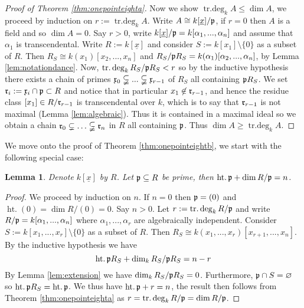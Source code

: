 \documentclass[12pt]{article}
\theoremstyle{plain}
\newtheorem{lemma}[thm]{Lemma}
\theoremstyle{definition}
\begin{document}
\begin{proof}[Proof of Theorem \ref{thm:onepointeighta}]
		Now we show $\operatorname{tr.deg}_kA \leq \operatorname{dim}A$, we proceed by induction on $r:= \operatorname{tr.deg}_kA$. Write $A \cong k[\underline{x}]/\frak{p}$, if $r = 0$ then $A$ is a field and so $\operatorname{dim}A = 0$. Say $r > 0$, write $k[\underline{x}]/\frak{p} = k[\alpha_1,...,\alpha_n]$ and assume that $\alpha_1$ is transcendental. Write $R := k[\underline{x}]$ and consider $S := k[x_1]\setminus\lbrace 0 \rbrace$ as a subset of $R$. Then $R_S \cong k(x_1)[x_2,...,x_n]$ and $R_S/\frak{p}R_S = k(\alpha_1)[\alpha_2,...,\alpha_n]$, by Lemma \ref{lem:notationdance}. Now, $\operatorname{tr.deg}_kR_S/\frak{p}R_S < r$ so by the inductive hypothesis there exists a chain of primes $\frak{x}_0 \subsetneqq ... \subsetneqq \frak{x}_{r-1}$ of $R_S$ all containing $\frak{p}R_S$. We set $\frak{r}_i := \frak{x}_i \cap \frak{p} \subset R$ and notice that in particular $x_1 \not\in \frak{r}_{r-1}$, and hence the residue class $[x_1] \in R/\frak{r}_{r-1}$ is transcendental over $k$, which is to say that $\frak{r}_{r-1}$ is not maximal (Lemma \ref{lem:algebraic}). Thus it is contained in a maximal ideal so we obtain a chain $\frak{r}_0 \subsetneq \hdots \subsetneqq \frak{r}_n$ in $R$ all containing $\frak{p}$. Thus $\operatorname{dim}A\geq \operatorname{tr.deg}_kA$.
	\end{proof}
	We move onto the proof of Theorem \ref{thm:onepointeightb}, we start with the following special case:
	\begin{lemma}
		\label{lemma:onepointeightb}
		Denote $k[\underline{x}]$ by $R$. Let $\frak{p} \subseteq R$ be prime, then $\operatorname{ht.}\frak{p} + \operatorname{dim}R/\frak{p} = n$.
	\end{lemma}
	\begin{proof}
		We proceed by induction on $n$. If $n = 0$ then $\frak{p} = (0)$ and $\operatorname{ht.}(0) = \operatorname{dim}R/(0) = 0$. Say $n > 0$. Let $r := \operatorname{tr.deg}_kR/\frak{p}$ and write $R/\frak{p} = k[\alpha_1,...,\alpha_n]$ where $\alpha_1,...,\alpha_r$ are algebraically independent. Consider $S := k[x_1,...,x_r]\setminus\lbrace 0 \rbrace$ as a subset of $R$. Then $R_S \cong k(x_1,...,x_r)[x_{r+1},...,x_n]$. By the inductive hypothesis we have
		\[\operatorname{ht.}\frak{p}R_S + \operatorname{dim}_kR_S/\frak{p}R_S = n - r\]
		By Lemma \ref{lem:extension} we have $\operatorname{dim}_kR_S/\frak{p}R_S = 0$. Furthermore, $\frak{p} \cap S = \varnothing$ so $\operatorname{ht.}\frak{p}R_S = \operatorname{ht.}\frak{p}$. We thus have $\operatorname{ht.}\frak{p} + r = n$, the result then follows from Theorem \ref{thm:onepointeighta} as $r = \operatorname{tr.deg}_kR/\frak{p} = \operatorname{dim}R/\frak{p}$.
	\end{proof}
\end{document}
